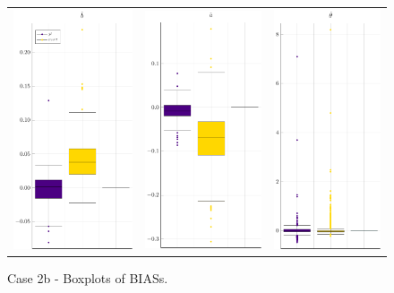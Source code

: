 \begin{figure}[ht]
	
	\centering \begin{tabular}[b]{c c c}
		\includegraphics[width=.3\textwidth]{Figures/2b/BIAS_b.pdf} & \includegraphics[width=.3\textwidth]{Figures/2b/BIAS_a.pdf} & \includegraphics[width=.3\textwidth]{Figures/2b/BIAS_t.pdf}
	\end{tabular}
	\caption{Case 2b - Boxplots of BIASs.}
	\label{fig:bpBIAS2b}
\end{figure}
